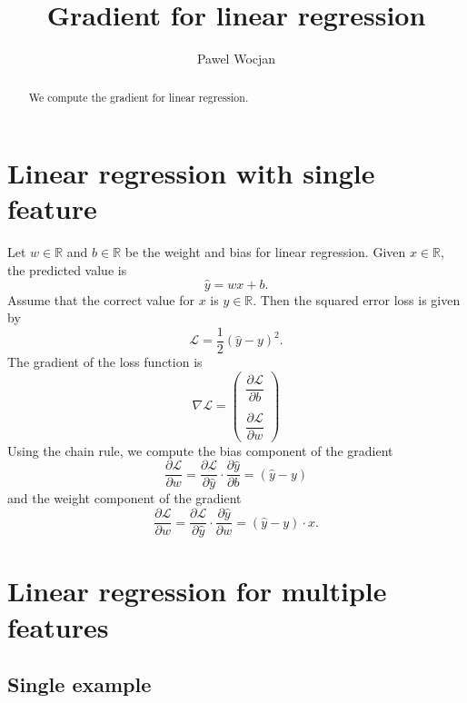 \documentclass[12pt]{article}
\title{Gradient for linear regression}
\author{Pawel Wocjan}
\newcommand{\R}{\mathbb{R}}
\begin{document}
\maketitle


\begin{abstract}
We compute the gradient for linear regression.
\end{abstract}

\section{Linear regression with single feature}

Let $w\in\R$ and $b\in\R$ be the weight and bias for linear regression.  Given $x\in\R$, the predicted value is
\begin{equation}
\hat{y} = w x + b.
\end{equation}
Assume that the correct value for $x$ is $y\in \R$.  Then the squared error loss is given by
\begin{equation}
\mathcal{L} = \frac{1}{2}(\hat{y}-y)^2.
\end{equation}
The gradient of the loss function is 
\begin{equation}
\nabla\mathcal{L} = \left(
\begin{array}{c}
\dfrac{\partial \mathcal{L}}{\partial b}  \\
\\
\dfrac{\partial \mathcal{L}}{\partial w} 
\end{array}
\right)
\end{equation}
Using the chain rule, we compute the bias component of the gradient
\begin{equation}
\dfrac{\partial \mathcal{L}}{\partial w} =
\dfrac{\partial \mathcal{L}}{\partial\hat{y}} \cdot \dfrac{\partial \hat{y}}{\partial b} =
(\hat{y} - y)
\end{equation}
and the weight component of the gradient
\begin{equation}
\dfrac{\partial \mathcal{L}}{\partial w} =
\dfrac{\partial \mathcal{L}}{\partial\hat{y}} \cdot \dfrac{\partial \hat{y}}{\partial w} =
(\hat{y} - y) \cdot x.
\end{equation}

\section{Linear regression for multiple features}

\subsection{Single example}
\end{document}
